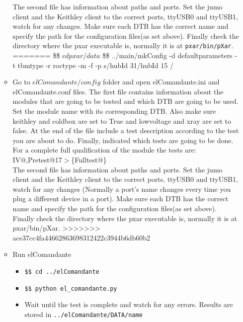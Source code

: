 \documentclass[12pt]{unlsilabsop}
\makeatletter
\newcommand{\at}{\makeatletter @\makeatother}
\makeatother
\begin{document}
\begin{enumerate}
\begin{itemize}
		The second file has information about paths and ports. Set the jumo client and the Keithley client to the correct ports, ttyUSB0 and ttyUSB1, watch for any changes. Make sure each DTB has the correct name and specify the path for the configuration files(as set above). Finally check the directory where the pxar executable is, normally it is at \texttt{pxar/bin/pXar}.
=======
		\$\$ $cd pxar/data$
		\$\$ ../main/mkConfig -d defaultparameters -t tbmtype -r roctype -m -f -p \textsc{}s/hubId 31/hubId 15 	\textsc{}/
		\item Go to $elComandante/config$ folder and open elComandante.ini and elComandante.conf files. The first file contains information about the modules that are going to be tested and which DTB are going to be used. Set the module name with its corresponding DTB. Also make sure keithley and coldbox are set to True and lowvoltage and xray are set to false. At the end of the file include a test description according to the test you are about to do. Finally, indicated which tests are going to be done. For a complete full qualification of the module the tests are: IV\at 17,Pretest{\at}17$>$\{Fulltest\at 17\}\\
		The second file has information about paths and ports. Set the jumo client and the Keithley client to the correct ports, ttyUSB0 and ttyUSB1, watch for any changes (Normally a port's name changes every time you plug a different device in a port). Make sure each DTB has the correct name and specify the path for the configuration files(as set above). Finally check the directory where the pxar executable is, normally it is at pxar/bin/pXar.
>>>>>>> ace37cc4fa44662863698312422c3944b6db60b2
		\item Run elComandante
		\begin{itemize}
			\item \texttt{\$\$ cd ../elComandante}
			\item \texttt{\$\$ python el\_comandante.py}
			\item Wait until the test is complete and watch for any errors. Results are stored in \texttt{../elComandante/DATA/name}
		\end{itemize}
	\end{itemize}
   

\end{enumerate}
\end{document}
